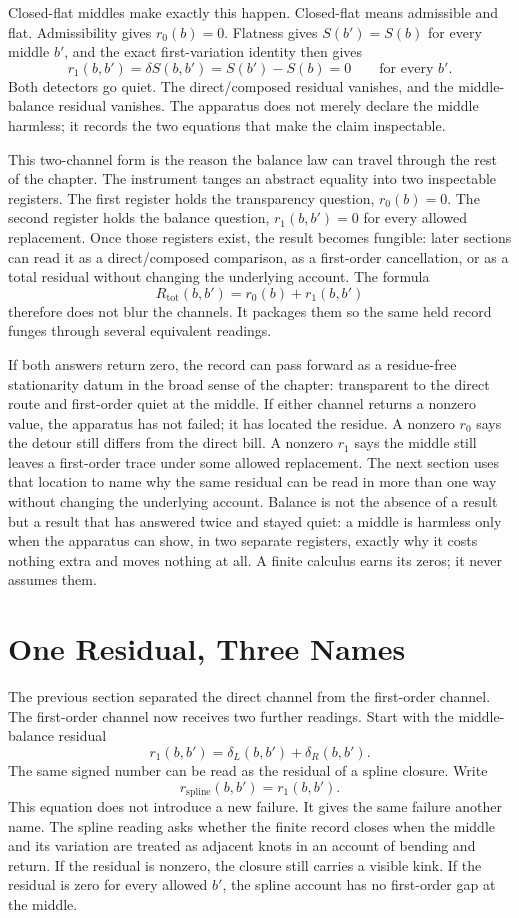 Closed-flat middles make exactly this happen. Closed-flat means admissible and flat. Admissibility gives $r_0(b)=0$. Flatness gives $S(b')=S(b)$ for every middle $b'$, and the exact first-variation identity then gives
\[
  r_1(b,b') = \delta S(b,b') = S(b')-S(b)=0
  \qquad \text{for every } b'.
\]
Both detectors go quiet. The direct/composed residual vanishes, and the middle-balance residual vanishes. The apparatus does not merely declare the middle harmless; it records the two equations that make the claim inspectable.

This two-channel form is the reason the balance law can travel through the rest of the chapter. The instrument tanges an abstract equality into two inspectable registers. The first register holds the transparency question, $r_0(b)=0$. The second register holds the balance question, $r_1(b,b')=0$ for every allowed replacement. Once those registers exist, the result becomes fungible: later sections can read it as a direct/composed comparison, as a first-order cancellation, or as a total residual without changing the underlying account. The formula
\[
  R_{\mathrm{tot}}(b,b') = r_0(b) + r_1(b,b')
\]
therefore does not blur the channels. It packages them so the same held record funges through several equivalent readings.

If both answers return zero, the record can pass forward as a residue-free stationarity datum in the broad sense of the chapter: transparent to the direct route and first-order quiet at the middle. If either channel returns a nonzero value, the apparatus has not failed; it has located the residue. A nonzero $r_0$ says the detour still differs from the direct bill. A nonzero $r_1$ says the middle still leaves a first-order trace under some allowed replacement. The next section uses that location to name why the same residual can be read in more than one way without changing the underlying account. Balance is not the absence of a result but a result that has answered twice and stayed quiet: a middle is harmless only when the apparatus can show, in two separate registers, exactly why it costs nothing extra and moves nothing at all. A finite calculus earns its zeros; it never assumes them.

\section{One Residual, Three Names}

The previous section separated the direct channel from the first-order channel. The first-order channel now receives two further readings. Start with the middle-balance residual
\[
  r_1(b,b') = \delta_L(b,b') + \delta_R(b,b').
\]
The same signed number can be read as the residual of a spline closure. Write
\[
  r_{\mathrm{spline}}(b,b') = r_1(b,b').
\]
This equation does not introduce a new failure. It gives the same failure another name. The spline reading asks whether the finite record closes when the middle and its variation are treated as adjacent knots in an account of bending and return. If the residual is nonzero, the closure still carries a visible kink. If the residual is zero for every allowed $b'$, the spline account has no first-order gap at the middle.

